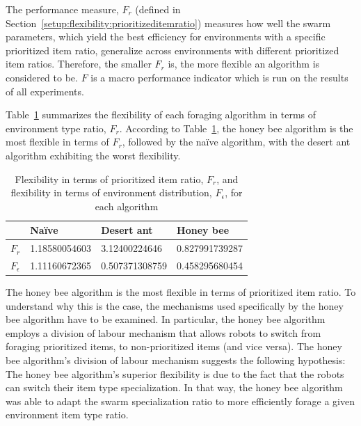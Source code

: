 The performance measure, $F_r$ (defined in Section~\ref{setup:flexibility:prioritizeditemratio}) measures how well the swarm parameters, which yield the best efficiency for environments with a specific prioritized item ratio, generalize across environments with different prioritized item ratios. Therefore, the smaller $F_r$ is, the more flexible an algorithm is considered to be. $F$ is a macro performance indicator which is run on the results of all experiments. 

Table~\ref{table:flexibility} summarizes the flexibility of each foraging algorithm in terms of environment type ratio, $F_r$. According to Table~\ref{table:flexibility}, the honey bee algorithm is the most flexible in terms of $F_r$, followed by the na\"ive algorithm, with the desert ant algorithm exhibiting the worst flexibility. 

 
\begin{table}[!htbp]
\centering
\caption{Flexibility in terms of prioritized item ratio, $F_r$, and flexibility in terms of environment distribution, $F_\epsilon$, for each algorithm}
\label{table:flexibility}
\begin{tabular}{@{}llll@{}}
\toprule
\textbf{}         & Na\"ive         & Desert ant        & Honey bee         \\ \midrule
\textbf{$F_r$}    & 1.18580054603 & 3.12400224646     & 0.827991739287    \\ \midrule
\textbf{$F_\epsilon$} & 1.11160672365 & 0.507371308759 & 0.458295680454 
\end{tabular}
\end{table}

The honey bee algorithm is the most flexible in terms of prioritized item ratio. To understand why this is the case, the mechanisms used specifically by the honey bee algorithm have to be examined. In particular, the honey bee algorithm employs a division of labour mechanism that allows robots to switch from foraging prioritized items, to non-prioritized items (and vice versa). The honey bee algorithm's division of labour mechanism suggests the following hypothesis: The honey bee algorithm's superior flexibility is due to the fact that the robots can switch their item type specialization. In that way, the honey bee algorithm was able to adapt the swarm specialization ratio to more efficiently forage a given environment item type ratio.

